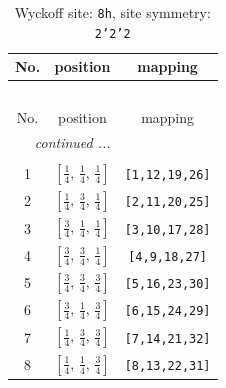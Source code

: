 \documentclass[fleqn,8pt]{jsarticle}
\begin{document}
\begin{longtable}{ccc}
\caption{Wyckoff site: {\tt 8h}, site symmetry: {\tt 2'2'2}}
 \\
 \hline \hline
No. & position & mapping \\ \hline \endfirsthead

\multicolumn{2}{l}{\tablename\ \thetable{}} \\
 \hline \hline
No. & position & mapping \\ \hline \endhead

 \hline \hline
\multicolumn{2}{r}{\footnotesize\it continued ...} \\ \endfoot

 \hline \hline
\multicolumn{2}{r}{} \\ \endlastfoot

1 & $\left[ \frac{1}{4},\, \frac{1}{4},\, \frac{1}{4} \right]$ & {\tt [1,12,19,26]} \\ \hline
2 & $\left[ \frac{1}{4},\, \frac{3}{4},\, \frac{1}{4} \right]$ & {\tt [2,11,20,25]} \\ \hline
3 & $\left[ \frac{3}{4},\, \frac{1}{4},\, \frac{1}{4} \right]$ & {\tt [3,10,17,28]} \\ \hline
4 & $\left[ \frac{3}{4},\, \frac{3}{4},\, \frac{1}{4} \right]$ & {\tt [4,9,18,27]} \\ \hline
5 & $\left[ \frac{3}{4},\, \frac{3}{4},\, \frac{3}{4} \right]$ & {\tt [5,16,23,30]} \\ \hline
6 & $\left[ \frac{3}{4},\, \frac{1}{4},\, \frac{3}{4} \right]$ & {\tt [6,15,24,29]} \\ \hline
7 & $\left[ \frac{1}{4},\, \frac{3}{4},\, \frac{3}{4} \right]$ & {\tt [7,14,21,32]} \\ \hline
8 & $\left[ \frac{1}{4},\, \frac{1}{4},\, \frac{3}{4} \right]$ & {\tt [8,13,22,31]} \\
\end{longtable}
\renewcommand{\arraystretch}{1.2}
\end{document}

